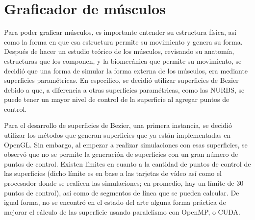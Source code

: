%

\section{Graficador de músculos}

Para poder graficar músculos, es importante entender su estructura física, así como la forma en que esa estructura permite su movimiento y genera su forma. Después de hacer un estudio teórico de los músculos, revisando su anatomía, estructuras que los componen, y la biomecánica que permite su movimiento, se decidió que una forma de simular la forma externa de los músculos, era mediante superficies paramétricas. En específico, se decidió utilizar superficies de Bezier debido a que, a diferencia a otras superficies paramétricas, como las NURBS, se puede tener un mayor nivel de control de la superficie al agregar puntos de control. 

Para el desarrollo de superficies de Bezier, una primera instancia, se decidió utilizar los métodos que generan superficies que ya están implementadas en OpenGL. Sin embargo, al empezar a realizar simulaciones con esas superficies, se observó que no se permite la generación de superficies con un gran número de puntos de control. Existen límites en cuanto a la cantidad de puntos de control de las superficies (dicho límite es en base a las tarjetas de vídeo así como el procesador donde se realicen las simulaciones; en promedio, hay un límite de 30 puntos de control), así como de segmentos de línea que se pueden calcular. De igual forma, no se encontró en el estado del arte alguna forma práctica de mejorar el cálculo de las superficie usando paralelismo con OpenMP, o CUDA. 

